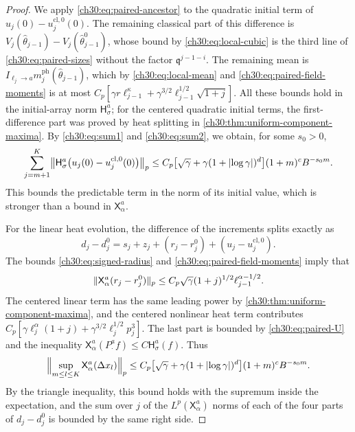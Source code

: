 \begin{proof}
We apply \eqref{ch30:eq:paired-ancestor} to the quadratic initial term of $u_j(0)-u_j^{\mathrm{cl},0}(0)$. The remaining classical part of this difference is $V_j(\widehat\theta_{j-1})-V_j(\widehat\theta_{j-1}^0)$, whose bound by \eqref{ch30:eq:local-cubic} is the third line of \eqref{ch30:eq:paired-sizes} without the factor $\mathfrak q^{j-1-i}$. The remaining mean is $I_{\ell_j\to a}m_j^{\mathrm{ph}}(\widehat\theta_{j-1})$, which by \eqref{ch30:eq:local-mean} and \eqref{ch30:eq:paired-field-moments} is at most $C_p[\gamma r\ell_{j-1}^\kappa+\gamma^{3/2}\ell_{j-1}^{1/2}\sqrt{1+j}]$. All these bounds hold in the initial-array norm $\mathsf H_\sigma^a$; for the centered quadratic initial terms, the first-difference part was proved by heat splitting in \cref{ch30:thm:uniform-component-maxima}. By \eqref{ch30:eq:sum1} and \eqref{ch30:eq:sum2}, we obtain, for some $s_0>0$,
\begin{equation}\label{ch30:eq:paired-U}
 \sum_{j=m+1}^K\bigl\lVert\mathsf H_\sigma^a\bigl(u_j(0)-u_j^{\mathrm{cl},0}(0)\bigr)\bigr\rVert_p\le C_p\bigl[\sqrt\gamma+\gamma(1+\lvert \log\gamma\rvert)^d\bigr](1+m)^cB^{-s_0m}.
\end{equation}
This bounds the predictable term in the norm of its initial value, which is stronger than a bound in $\mathsf X_\alpha^a$.

For the linear heat evolution, the difference of the increments splits exactly as
\[
 d_j-d_j^0=s_j+z_j+(r_j-r_j^0)+(u_j-u_j^{\mathrm{cl},0}).
\]
The bounds \eqref{ch30:eq:signed-radius} and \eqref{ch30:eq:paired-field-moments} imply that
\[
 \lVert \mathsf X_\alpha^a(r_j-r_j^0)\rVert_p\le C_p\sqrt\gamma(1+j)^{1/2}\ell_{j-1}^{\alpha-1/2}.
\]
The centered linear term has the same leading power by \cref{ch30:thm:uniform-component-maxima}, and the centered nonlinear heat term contributes $C_p[\gamma\ell_j^\alpha(1+j)+\gamma^{3/2}\ell_j^{1/2}p_j^3]$. The last part is bounded by \eqref{ch30:eq:paired-U} and the inequality $\mathsf X_\alpha^a(P_\cdot^af)\le C\mathsf H_\sigma^a(f)$. Thus
\begin{equation}\label{ch30:eq:paired-X}
 \Bigl\lVert\sup_{m\le l\le K}\mathsf X_\alpha^a(\Delta x_l)\Bigr\rVert_p\le C_p\bigl[\sqrt\gamma+\gamma(1+\lvert \log\gamma\rvert)^d\bigr](1+m)^cB^{-s_0m}.
\end{equation}
By the triangle inequality, this bound holds with the supremum inside the expectation, and the sum over $j$ of the $L^p(\mathsf X_\alpha^a)$ norms of each of the four parts of $d_j-d_j^0$ is bounded by the same right side.


\end{proof}

